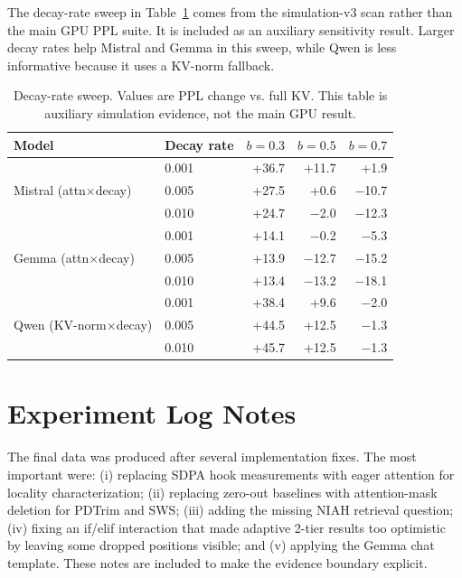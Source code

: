 \documentclass[11pt]{article}
\newcommand{\niah}{NIAH}
\newcommand{\budget}{b}
\theoremstyle{plain}
\theoremstyle{definition}
\begin{document}
The decay-rate sweep in Table~\ref{tab:decay} comes from the simulation-v3 scan rather than the main GPU PPL suite.  It is included as an auxiliary sensitivity result.  Larger decay rates help Mistral and Gemma in this sweep, while Qwen is less informative because it uses a KV-norm fallback.

\begin{table}[h]
\centering
\caption{Decay-rate sweep.  Values are PPL change vs. full KV.  This table is auxiliary simulation evidence, not the main GPU result.}
\label{tab:decay}
\small
\begin{tabular}{llrrr}
\toprule
Model & Decay rate & $\budget=0.3$ & $\budget=0.5$ & $\budget=0.7$ \\
\midrule
\multirow{3}{*}{Mistral (attn$\times$decay)} & 0.001 & +36.7 & +11.7 & +1.9 \\
 & 0.005 & +27.5 & +0.6 & $-$10.7 \\
 & 0.010 & +24.7 & $-$2.0 & $-$12.3 \\
\midrule
\multirow{3}{*}{Gemma (attn$\times$decay)} & 0.001 & +14.1 & $-$0.2 & $-$5.3 \\
 & 0.005 & +13.9 & $-$12.7 & $-$15.2 \\
 & 0.010 & +13.4 & $-$13.2 & $-$18.1 \\
\midrule
\multirow{3}{*}{Qwen (KV-norm$\times$decay)} & 0.001 & +38.4 & +9.6 & $-$2.0 \\
 & 0.005 & +44.5 & +12.5 & $-$1.3 \\
 & 0.010 & +45.7 & +12.5 & $-$1.3 \\
\bottomrule
\end{tabular}
\end{table}

\section{Experiment Log Notes}
\label{app:notes}

The final data was produced after several implementation fixes.  The most important were: (i) replacing SDPA hook measurements with eager attention for locality characterization; (ii) replacing zero-out baselines with attention-mask deletion for PDTrim and SWS; (iii) adding the missing \niah{} retrieval question; (iv) fixing an if/elif interaction that made adaptive 2-tier results too optimistic by leaving some dropped positions visible; and (v) applying the Gemma chat template.  These notes are included to make the evidence boundary explicit.



\end{document}
